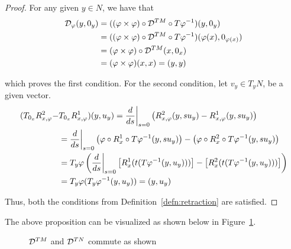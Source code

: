 \begin{proof}
  For any given $y \in N$, we have that 
  \begin{equation*}
    \begin{split}
      \mathcal{D}_{\varphi} (y, 0_y) &= ((\varphi \times \varphi) \circ \mathcal{D}^{TM} \circ T\varphi^{-1}) (y, 0_y) \\
      &= ((\varphi \times \varphi) \circ \mathcal{D}^{TM} \circ T\varphi^{-1}) (\varphi(x), 0_{\varphi(x)}) \\
      &= (\varphi \times \varphi) \circ \mathcal{D}^{TM} (x, 0_x) \\ 
      &= (\varphi \times \varphi) (x, x) = (y, y)
    \end{split}
  \end{equation*}

  which proves the first condition. For the second condition, let $v_y \in T_y N$, be a given vector.
  \begin{equation*}
    \begin{split}
      (T_{0_x} R_{x, \varphi}^2 - & T_{0_x} R_{x, \varphi}^1 )(y, u_y) = \dfrac{d}{ds} \bigg{|}_{s=0} \left( R_{x, \varphi}^2 (y, su_y) - R_{x, \varphi}^1 (y, su_y) \right) \\
      &= \dfrac{d}{ds} \bigg{|}_{s=0} \left(\varphi \circ R^1_x \circ T\varphi^{-1} (y, su_y) \right) -  \left( \varphi \circ R^2_x \circ T \varphi^{-1}(y, su_y) \right) \\
      &= T_y \varphi \left( \dfrac{d}{ds} \bigg{|}_{s=0} \left[ R^1_x(t(T\varphi^{-1} (y, u_y))) \right] - \left[ R^2_x(t(T\varphi^{-1} (y, u_y))) \right] \right) \\
      &= T_y \varphi (T_y \varphi^{-1} (y, u_y)) = (y, u_y)
    \end{split}
  \end{equation*}

Thus, both the conditions from Definition~\ref{defn:retraction} are satisfied.
\end{proof}

The above proposition can be visualized as shown below in Figure~\ref{fig:commutator}.

\begin{figure}[h]
  \centering
  \caption{$\mathcal{D}^{TM}$ and $\mathcal{D}^{TN}$ commute as shown}
  \label{fig:commutator}
\end{figure}

